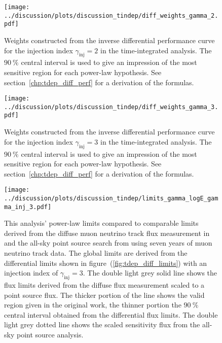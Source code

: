 \begin{figure}[H]
  \centering
  \texttt{[image: ../discussion/plots/discussion\_tindep/diff\_weights\_gamma\_2.pdf]}
  \caption[Differential performance weights for $\gamma_\text{inj}=2$]{
    Weights constructed from the inverse differential performance curve for the injection index $\gamma_\text{inj}=2$ in the time-integrated analysis.
    The $\SI{90}{\percent}$ central interval is used to give an impression of the most sensitive region for each power-law hypothesis.
    See section~\ref{chp:tdep_diff_perf} for a derivation of the formulas.
  }
  \label{fig:tindep_diff_weights_gamma_2}
\end{figure}
\enlargethispage*{5cm}
\begin{figure}[H]
  \centering
  \texttt{[image: ../discussion/plots/discussion\_tindep/diff\_weights\_gamma\_3.pdf]}
  \caption[Differential performance weights for $\gamma_\text{inj}=3$]{
    Weights constructed from the inverse differential performance curve for the injection index $\gamma_\text{inj}=3$ in the time-integrated analysis.
    The $\SI{90}{\percent}$ central interval is used to give an impression of the most sensitive region for each power-law hypothesis.
    See section~\ref{chp:tdep_diff_perf} for a derivation of the formulas.
  }
  \label{fig:tindep_diff_weights_gamma_3}
\end{figure}

\begin{figure}[H]
  \centering
  \texttt{[image: ../discussion/plots/discussion\_tindep/limits\_gamma\_logE\_gamma\_inj\_3.pdf]}
  \caption[Time-integrated analysis global power-law limits]{
    This analysis' power-law limits compared to comparable limits derived from the diffuse muon neutrino track flux measurement in \cite{Haack:2017dxi} and the all-sky point source search from \cite{Aartsen:2016oji} using seven years of muon neutrino track data.
    The global limits are derived from the differential limits shown in figure~(\ref{fig:tdep_diff_limits}) with an injection index of $\gamma_\text{inj}=3$.
    The double light grey solid line shows the flux limits derived from the diffuse flux measurement scaled to a point source flux.
    The thicker portion of the line shows the valid region given in the original work, the thinner portion the $\SI{90}{\percent}$ central interval obtained from the differential flux limits.
    The double light grey dotted line shows the scaled sensitivity flux from the all-sky point source analysis.
  }
  \label{fig:tdep_limits_gamma_logE_gamma_inj_3}
\end{figure}
